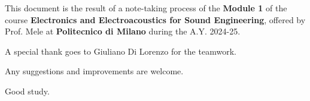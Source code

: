 \setcounter{page}{0}
\thispagestyle{nohead}

\vspace*{\fill}
\begin{center}
This document is the result of a note-taking process of the \textbf{Module 1} of the course \textbf{ Electronics and Electroacoustics for Sound Engineering}, offered by Prof. Mele at \textbf{Politecnico di Milano} during the A.Y. 2024-25.

A special thank goes to Giuliano Di Lorenzo for the teamwork.

Any suggestions and improvements are welcome.

Good study.

\end{center}

\vspace*{\fill}

\clearpage
